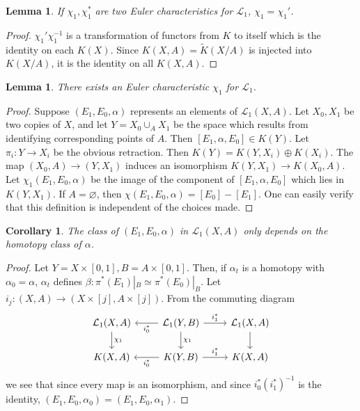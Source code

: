 \documentclass[leqno]{book}
\numberwithin{equation}{section}
\newtheorem{corollary}[theorem]{Corollary}
\newtheorem{lemma}[theorem]{Lemma}
\theoremstyle{definition}
\begin{document}
            \begin{lemma}
              If $\chi_1,\chi_1^{*}$ are two Euler characteristics for $\mathcal{L}_{1}$, $\chi_1=\chi_1'$.
            \end{lemma}

            \begin{proof}
              $\chi_1'\chi_1^{-1}$ is a transformation of functors from $K$ to itself which is the identity on each $K(X)$. Since $K(X,A)=\tilde{K}(X/A)$ is injected into $K(X/A)$, it is the identity on all $K(X,A)$.
            \end{proof}

            \begin{lemma}
              There exists an Euler characteristic $\chi_1$ for $\mathcal{L}_{1}$.
            \end{lemma}

            \begin{proof}
              Suppose $(E_1,E_0,\alpha)$ represents an elements of $\mathcal{L}_{1}(X,A)$. Let $X_0,X_1$ be two copies of $X$, and let $Y=X_0\cup_{A}X_1$ be the space which results from identifying corresponding points of $A$. Then $[E_1,\alpha,E_0]\in K(Y)$. Let $\pi_{i}:Y\to X_{i}$ be the obvious retraction. Then $K(Y)=K(Y,X_{i})\oplus K(X_{i})$. The map $(X_{0},A)\to (Y,X_1)$ induces an isomorphism $K(Y,X_1)\to K(X_0,A)$. Let $\chi_1(E_1,E_0,\alpha)$ be the image of the component of $[E_1,\alpha,E_0]$ which lies in $K(Y,X_1)$. If $A=\varnothing$, then $\chi(E_1,E_0,\alpha)=[E_0]-[E_1]$. One can easily verify that this definition is independent of the choices made.
            \end{proof}

            \begin{corollary}
              The class of $(E_1,E_0,\alpha)$ in $\mathcal{L}_{1}(X,A)$ only depends on the homotopy class of $\alpha$.
            \end{corollary}

            \begin{proof}
              Let $Y=X\times [0,1],B=A\times [0,1]$. Then, if $\alpha _{t}$ is a homotopy with $\alpha _{0}=\alpha$, $\alpha _{t}$ defines $\beta:\pi^{*}(E_1)|_{B}\simeq \pi^{*}(E_0)|_{B}$. Let $i_{j}:(X,A)\to (X\times[j],A\times [j])$. From the commuting diagram
              \begin{equation*}
                \begin{tikzcd}
                  \mathcal{L}_{1}(X,A)\arrow[d, "\chi_1"] & \mathcal{L}_{1}(Y,B) \arrow[d, "\chi_1"] \arrow[r, "i_1^{*}"] \arrow[l, "i_0^{*}"] & \mathcal{L}_{1}(X,A) \arrow[d] \\
                  K(X,A) & K(Y,B) \arrow[r, "i_1^{*}"] \arrow[l, "i_0^{*}"] & K(X,A)
                \end{tikzcd}
              \end{equation*}
              we see that since every map is an isomorphism, and since $i_0^{*}(i_1^{*})^{-1}$ is the identity, $(E_1,E_0,\alpha_0)=(E_1,E_0,\alpha_1)$.
            \end{proof}
\end{document}
